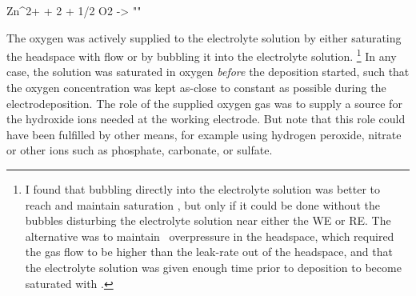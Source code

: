 \documentclass[webedition,openright,titles,swedish,english]{LuaUUThesis}\usepackage[]{graphicx}\usepackage[]{xcolor}
\begin{document}
\hspace{14mm}%
\begin{minipage}{75mm}
   \vspace{-\baselineskip}
   \hrulefill
\end{minipage}
\begin{reaction}
Zn^{2+}\aq{} + 2 \electron{} + 1/2 O2\aq{} -> \ZnO\sld{} \phantom{ZnOZnOZnO}
 "\label{rxn:ZnO-dep}"
\end{reaction}
The oxygen was actively supplied to the electrolyte solution by either saturating
the headspace with  flow or by bubbling it into the electrolyte solution.%
\footnote{%
   I found that bubbling  directly into the electrolyte solution
   was better to reach and maintain saturation \ch{[O2\aq]}, but only if
   it could be done without the bubbles disturbing the electrolyte solution
   near either the \gls{WE} or \gls{RE}.
   The alternative was to maintain \oxygen\ overpressure in the headspace,
   which required the gas flow to be higher than the leak-rate out
   of the headspace, and that the electrolyte solution was given enough time
   prior to deposition to become saturated with \oxygen.
}
In any case, the solution was saturated in oxygen \emph{before} the deposition
started, such that the oxygen concentration was kept as-close to constant as possible
during the electrodeposition.
The role of the supplied oxygen gas was to supply a source for the hydroxide ions needed at
the working electrode. But note that this role could have been fulfilled by other means,
for example using hydrogen peroxide, nitrate or other ions such as phosphate,
carbonate, or sulfate.
\end{document}
